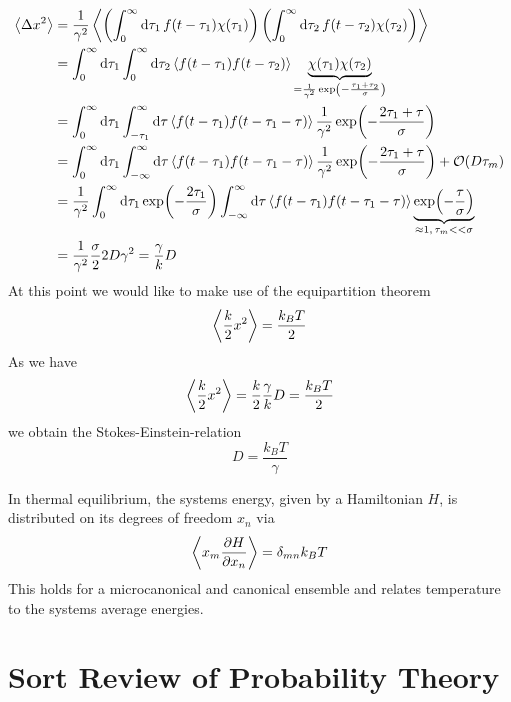 \documentclass{/home/ben/Templates/notebook}
\begin{document}
	\begin{align*}
		\expval{\Delta x^2} &= \frac{1}{\gamma^2} \expval{\left( \int_0^{\infty}{\dd{\tau_1} f(t-\tau_1) \chi(\tau_1)} \right) \left( \int_0^{\infty}{\dd{\tau_2} f(t-\tau_2) \chi(\tau_2)} \right)} \\
		&= \int_0^{\infty} \dd{\tau_1} \int_0^{\infty} \dd{\tau_2} \expval{f(t-\tau_1) f(t-\tau_2)} \underbrace{\chi(\tau_1) \chi(\tau_2)}_{= \frac{1}{\gamma^2} \exp(- \frac{\tau_1 + \tau_2}{\sigma})} \\
		&= \int_0^{\infty} \dd{\tau_1} \int_{-\tau_1}^{\infty} \dd{\tau} \expval{f(t-\tau_1) f(t-\tau_1 - \tau)}  \frac{1}{\gamma^2} \exp(- \frac{2\tau_1 + \tau}{\sigma}) \\
		&= \int_0^{\infty} \dd{\tau_1} \int_{-\infty}^{\infty} \dd{\tau} \expval{f(t-\tau_1) f(t-\tau_1 - \tau)}  \frac{1}{\gamma^2} \exp(- \frac{2\tau_1 + \tau}{\sigma}) + \mathcal{O}(D\tau_m) \\
		&= \frac{1}{\gamma^2} \int_0^{\infty} \dd{\tau_1} \exp(- \frac{2\tau_1}{\sigma}) \int_{-\infty}^{\infty} \dd{\tau} \expval{f(t-\tau_1) f(t-\tau_1 - \tau)} \underbrace{\exp(- \frac{\tau}{\sigma})}_{\approx 1, \, \tau_m << \sigma} \\
		&= \frac{1}{\gamma^2} \frac{\sigma}{2} 2 D \gamma^2 = \frac{\gamma}{k}D
	\end{align*}
	At this point we would like to make use of the equipartition theorem
	\begin{equation}
	\expval{\frac{k}{2}x^2} = \frac{k_B T}{2}
	\end{equation}
	As we have 
	\begin{equation}
	\expval{\frac{k}{2}x^2} = \frac{k}{2} \frac{\gamma}{k}D = \frac{k_B T}{2}
	\end{equation}
	we obtain the Stokes-Einstein-relation
	\begin{equation}
	D = \frac{k_B T}{\gamma}
	\end{equation}
	\begin{remark}
		In thermal equilibrium, the systems energy, given by a Hamiltonian $H$, is distributed on its degrees of freedom $x_n$ via
		\begin{equation}
		\expval{x_m \pdv{H}{x_n}} = \delta_{mn} k_B T
		\end{equation}
		This holds for a microcanonical and canonical ensemble and relates temperature to the systems average energies.
	\end{remark}
	
	
	\chapter{Sort Review of Probability Theory}
	
\end{document}

